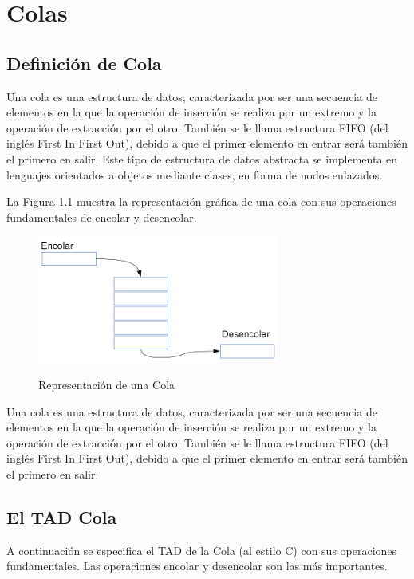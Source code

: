 \chapter{Colas}

\section{Definición de Cola}
Una cola es una estructura de datos, caracterizada por ser una secuencia de elementos en la que la operación de inserción  se realiza por un extremo y la operación de extracción por el otro. También se le llama estructura FIFO (del inglés First In First Out), debido a que el primer elemento en entrar será también el primero en salir. Este tipo de estructura de datos abstracta se implementa en lenguajes orientados a objetos mediante clases, en forma de nodos enlazados.

La Figura  \ref{fig:cola-representacion} muestra la representación gráfica de una cola con sus operaciones fundamentales de encolar y desencolar.


\begin{figure}
	\centering\textbf{}
		\includegraphics{Diagramas/RepresentacionCola}
	\caption{Representación de una Cola}	
	\label{fig:cola-representacion}
\end{figure}

\begin{definicion}
Una cola es una estructura de datos, caracterizada por ser una secuencia de elementos en la que la operación de inserción  se realiza por un extremo y la operación de extracción por el otro. También se le llama estructura FIFO (del inglés First In First Out), debido a que el primer elemento en entrar será también el primero en salir.
\end{definicion}

\section{El TAD Cola}
A continuación se especifica el TAD de la Cola (al estilo C) con sus operaciones fundamentales. Las operaciones encolar y desencolar son las más importantes. 

